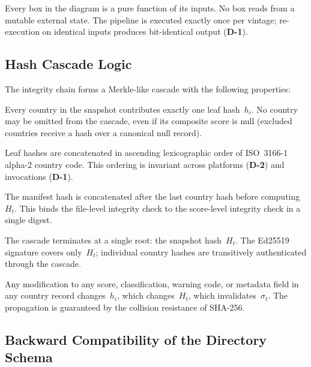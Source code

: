 Every box in the diagram is a pure function of its inputs.  No box reads
from a mutable external state.  The pipeline is executed exactly once per
vintage; re-execution on identical inputs produces bit-identical output
(\textbf{D-1}).

\subsection{Hash Cascade Logic}\label{sec:snapshot:cascade}

The integrity chain forms a Merkle-like cascade with the following
properties:

\begin{description}[style=nextline]
  \item[\textbf{C-1}~Leaf completeness.]
    Every country in the snapshot contributes exactly one leaf hash~\(h_i\).
    No country may be omitted from the cascade, even if its composite score
    is null (excluded countries receive a hash over a canonical null record).
  \item[\textbf{C-2}~Deterministic ordering.]
    Leaf hashes are concatenated in ascending lexicographic order of
    ISO~3166-1 alpha-2 country code.  This ordering is invariant across
    platforms (\textbf{D-2}) and invocations (\textbf{D-1}).
  \item[\textbf{C-3}~Manifest binding.]
    The manifest hash is concatenated after the last country hash before
    computing~\(H_t\).  This binds the file-level integrity check to the
    score-level integrity check in a single digest.
  \item[\textbf{C-4}~Single-root property.]
    The cascade terminates at a single root: the snapshot hash~\(H_t\).
    The Ed25519 signature covers only~\(H_t\); individual country hashes
    are transitively authenticated through the cascade.
  \item[\textbf{C-5}~Tamper propagation.]
    Any modification to any score, classification, warning code, or
    metadata field in any country record changes~\(h_i\), which
    changes~\(H_t\), which invalidates~\(\sigma_t\).  The propagation
    is guaranteed by the collision resistance of SHA-256.
\end{description}

\subsection{Backward Compatibility of the Directory Schema}%
\label{sec:snapshot:compat}

